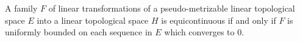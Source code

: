A family $F$ of linear transformations of a pseudo-metrizable linear topological space $E$ into a linear topological space $H$ is equicontinuous if and only if $F$ is uniformly bounded on each sequence in $E$ which converges to $0$.
